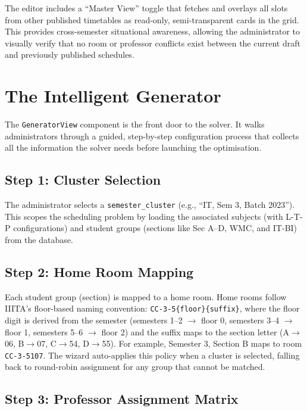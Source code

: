 The editor includes a ``Master View'' toggle that fetches and overlays all slots from other published timetables as read-only, semi-transparent cards in the grid. This provides cross-semester situational awareness, allowing the administrator to visually verify that no room or professor conflicts exist between the current draft and previously published schedules.

\section{The Intelligent Generator}
\label{sec:generator}

The \texttt{GeneratorView} component is the front door to the solver. It walks administrators through a guided, step-by-step configuration process that collects all the information the solver needs before launching the optimisation.

\subsection{Step 1: Cluster Selection}

The administrator selects a \texttt{semester\_cluster} (e.g., ``IT, Sem 3, Batch 2023''). This scopes the scheduling problem by loading the associated subjects (with L-T-P configurations) and student groups (sections like Sec A--D, WMC, and IT-BI) from the database.

\subsection{Step 2: Home Room Mapping}

Each student group (section) is mapped to a home room. Home rooms follow IIITA's floor-based naming convention: \texttt{CC-3-5\{floor\}\{suffix\}}, where the floor digit is derived from the semester (semesters 1--2 $\to$ floor 0, semesters 3--4 $\to$ floor 1, semesters 5--6 $\to$ floor 2) and the suffix maps to the section letter (A$\to$06, B$\to$07, C$\to$54, D$\to$55). For example, Semester 3, Section B maps to room \texttt{CC-3-5107}. The wizard auto-applies this policy when a cluster is selected, falling back to round-robin assignment for any group that cannot be matched.

\subsection{Step 3: Professor Assignment Matrix}

